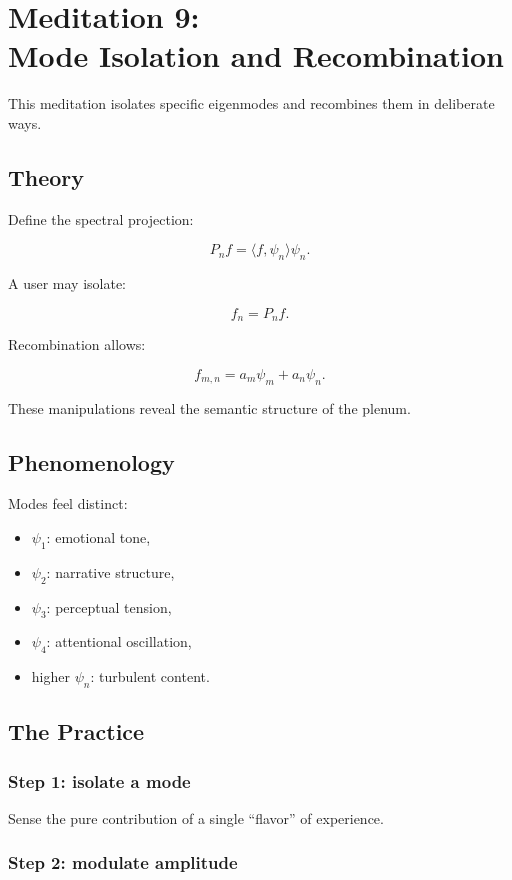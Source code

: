 \documentclass[12pt]{article}
\begin{document}
\chapter{Meditation 9:\\ Mode Isolation and Recombination}

This meditation isolates specific eigenmodes and recombines them in deliberate ways.

\section{Theory}

Define the spectral projection:

\[
P_n f = \langle f,\psi_n\rangle \psi_n.
\]

A user may isolate:

\[
f_n = P_n f.
\]

Recombination allows:

\[
f_{m,n} = a_m \psi_m + a_n \psi_n.
\]

These manipulations reveal the semantic structure of the plenum.

\section{Phenomenology}

Modes feel distinct:

\begin{itemize}
    \item $\psi_1$: emotional tone,
    \item $\psi_2$: narrative structure,
    \item $\psi_3$: perceptual tension,
    \item $\psi_4$: attentional oscillation,
    \item higher $\psi_n$: turbulent content.
\end{itemize}

\section{The Practice}

\subsection*{Step 1: isolate a mode}

Sense the pure contribution of a single ``flavor'' of experience.

\subsection*{Step 2: modulate amplitude}
\end{document}
